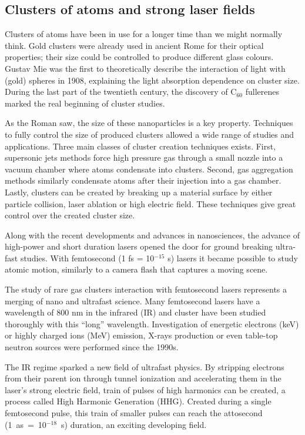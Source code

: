 \subsection{Clusters of atoms and strong laser fields}

Clusters of atoms have been in use for a longer time than we might normally
think. Gold clusters were already used in ancient Rome for their optical
properties; their size could be controlled to produce different glass colours.
Gustav Mie was the first to theoretically describe the interaction of light
with (gold) spheres in 1908, explaining the light absorption dependence
on cluster size. During the last part of the twentieth century, the discovery of
C$_{60}$ fullerenes marked the real beginning of cluster studies\cite{Reinhard2004}.

As the Roman saw, the size of these nanoparticles is a key property. Techniques to fully
control the size of produced clusters allowed a wide range of studies and
applications. Three main classes of cluster creation techniques
exists\cite{Reinhard2004}. First, supersonic jets methods force high pressure
gas through a small nozzle into a vacuum chamber where atoms condensate into
clusters. Second, gas aggregation methods similarly condensate atoms after
their injection into a gas chamber. Lastly, clusters can be created by breaking
up a material surface by either particle collision, laser ablation or high
electric field. These techniques give great control over the created cluster
size.

Along with the recent developments and advances in nanosciences,
the advance of high-power and short duration lasers opened the
door for ground breaking ultra-fast studies. With femtosecond
(1 fs = 10$^{-15}$ s) lasers it became possible to study atomic motion,
similarly to a camera flash that captures a moving scene.


The study of rare gas clusters interaction with femtosecond lasers represents a
merging of nano and ultrafast science.
%
Many femtosecond lasers
have a wavelength of 800 nm in the infrared (IR) and cluster have been studied
thoroughly with this ``long'' wavelength. Investigation of energetic
electrons (keV) or highly charged ions (MeV) emission, X-rays production or even
table-top neutron sources\cite{Krainov2007} were performed since the
1990s\cite{Haberland1994,Brabec2009}.


The IR regime sparked a new field of ultrafast physics. By stripping electrons
from their parent ion through tunnel ionization and accelerating them in the
laser's strong electric field, train of pulses of high harmonics can be created,
a process called High Harmonic Generation (HHG).
Created during a single femtosecond pulse, this train of smaller pulses
can reach the attosecond \mbox{(1 as = 10$^{-18}$ s)} duration, an exciting
developing field\cite{Levesque2006}.


